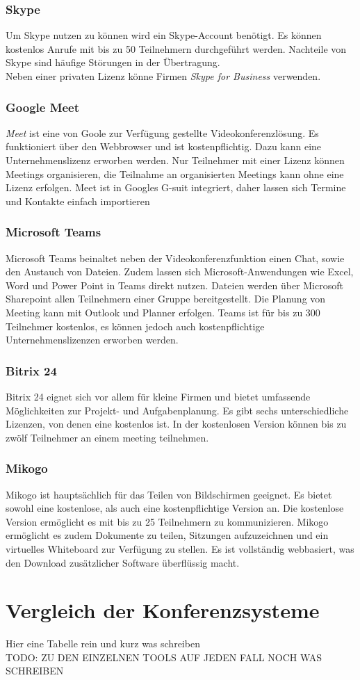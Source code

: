 \subsubsection{Skype}
Um Skype nutzen zu können wird ein Skype-Account benötigt.
Es können kostenlos Anrufe mit bis zu 50 Teilnehmern durchgeführt werden.
Nachteile von Skype sind häufige Störungen in der Übertragung.
\autocite[Vgl.][]{M_Straub.o.J.}
\\
Neben einer privaten Lizenz könne Firmen \textit{Skype for Business} verwenden.
\autocite[Vgl.][]{M_Microsoft.o.J.}

\subsubsection{Google Meet}
\textit{Meet} ist eine von Goole zur Verfügung gestellte Videokonferenzlösung.
Es funktioniert über den Webbrowser und ist kostenpflichtig.
Dazu kann eine Unternehmenslizenz erworben werden.
Nur Teilnehmer mit einer Lizenz können Meetings organisieren, die Teilnahme an organisierten Meetings kann ohne eine Lizenz erfolgen.
Meet ist in Googles G-suit integriert, daher lassen sich Termine und Kontakte einfach importieren
\autocite[Vgl.][]{M_Straub.o.J.}

\subsubsection{Microsoft Teams}
Microsoft Teams beinaltet neben der Videokonferenzfunktion einen Chat, sowie den Austauch von Dateien.
Zudem lassen sich Microsoft-Anwendungen wie Excel, Word und Power Point in Teams direkt nutzen.
Dateien werden über Microsoft Sharepoint allen Teilnehmern einer Gruppe bereitgestellt.
Die Planung von Meeting kann mit Outlook und Planner erfolgen.
Teams ist für bis zu 300 Teilnehmer kostenlos, es können jedoch auch kostenpflichtige Unternehmenslizenzen erworben werden.
\autocite[Vgl.][]{M_Straub.o.J.}

\subsubsection{Bitrix 24}
Bitrix 24 eignet sich vor allem für kleine Firmen und bietet umfassende Möglichkeiten zur Projekt- und Aufgabenplanung.
Es gibt sechs unterschiedliche Lizenzen, von denen eine kostenlos ist.
In der kostenlosen Version können bis zu zwölf Teilnehmer an einem meeting teilnehmen.
\autocite[Vgl.][]{M_Straub.o.J.}

\subsubsection{Mikogo}
Mikogo ist hauptsächlich für das Teilen von Bildschirmen geeignet.
Es bietet sowohl eine kostenlose, als auch eine kostenpflichtige Version an.
Die kostenlose Version ermöglicht es mit bis zu 25 Teilnehmern zu kommunizieren.
Mikogo ermöglicht es zudem Dokumente zu teilen, Sitzungen aufzuzeichnen und ein virtuelles Whiteboard zur Verfügung zu stellen.
Es ist vollständig webbasiert, was den Download zusätzlicher Software überflüssig macht.
\autocite[Vgl.][]{M_Straub.o.J.}

\section{Vergleich der Konferenzsysteme}
Hier eine Tabelle rein und kurz was schreiben\\
TODO: ZU DEN EINZELNEN TOOLS AUF JEDEN FALL NOCH WAS SCHREIBEN